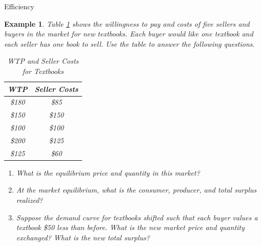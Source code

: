 \documentclass[xcolor={dvipsnames},pdf, hyperref={colorlinks=true, citecolor=ForestGreen, linkcolor=BlueViolet, urlcolor=Magenta}]{beamer}
\newtheorem{exmp}{Example}[section]
\begin{document}
\begin{frame}{Efficiency}
	\begin{exmp}
		\scriptsize
		Table \ref{SA2} shows the willingness to pay and costs of five sellers and buyers in the market for new textbooks. Each buyer would like one textbook and each seller has one book to sell. Use the table to answer the following questions.
		
		\begin{table}[ht]
			\caption{WTP and Seller Costs for Textbooks}
			\centering
			\begin{tabular}{  c| c} 
				
				WTP   & Seller Costs \\
				\hline
				\$180 & \$85 \\
				\$150 & \$150 \\
				\$100 & \$100 \\
				\$200 & \$125 \\
				\$125 & \$60 \\
			\end{tabular}
			\label{SA2}
		\end{table}
	
		
		\begin{enumerate}
			\item What is the equilibrium price and quantity in this market?
			\item At the market equilibrium, what is the consumer, producer, and total surplus realized?			
			\item Suppose the demand curve for textbooks shifted such that each buyer values a textbook \$50 less than before. What is the new market price and quantity exchanged? What is the new total surplus?
		\end{enumerate}
	\end{exmp}
\end{frame}
\end{document}
